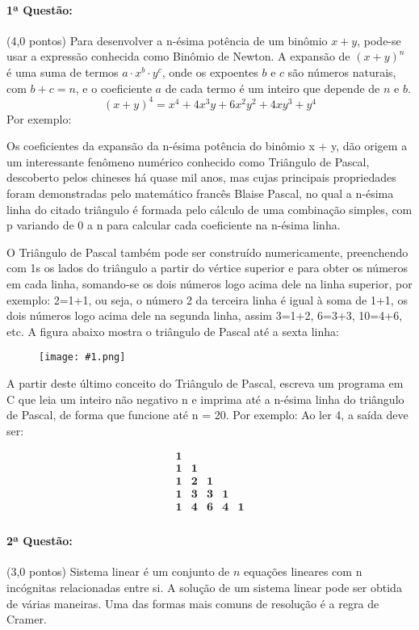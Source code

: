 \documentclass[12pt,a4paper]{article}
\newcommand{\imgh}[2]{\begin{figure}[h]
\centering
\texttt{[image: \#1.png]}
\end{figure}}
\begin{document}
\paragraph{1ª Questão:} (4,0 pontos) Para desenvolver a n-ésima potência de um binômio $x+y$, pode-se usar a expressão conhecida como Binômio de Newton. A expansão de $(x+y)^n$ é uma suma de termos $a\cdot x^b\cdot y^c$, onde os expoentes $b$ e $c$ são números naturais, com $b+c=n$, e o coeficiente $a$ de cada termo é um inteiro que depende de $n$ e $b$. $$(x+y)^4 = x^4 + 4x^3y + 6x^2y^2 + 4xy^3 + y^4$$ Por exemplo:

Os coeficientes da expansão da n-ésima potência do binômio x + y, dão origem a um interessante fenômeno numérico conhecido como Triângulo de Pascal, descoberto pelos chineses há quase mil anos,
mas cujas principais propriedades foram demonstradas pelo matemático francês Blaise Pascal, no qual a n-ésima linha do citado triângulo é formada pelo cálculo de uma combinação simples, com p variando de 0 a n para calcular cada coeficiente na n-ésima linha.

O Triângulo de Pascal também pode ser construído numericamente, preenchendo com 1s os lados do triângulo a partir do vértice superior e para obter os números em cada linha, somando-se os dois
números logo acima dele na linha superior, por exemplo: 2=1+1, ou seja, o número 2 da terceira linha é igual à soma de 1+1, os dois números logo acima dele na segunda linha, assim 3=1+2, 6=3+3, 10=4+6, etc. A figura abaixo mostra o triângulo de Pascal até a sexta linha:

\imgh{icvc2015q1fig1}{4}

A partir deste último conceito do Triângulo de Pascal, escreva um programa em C que leia um inteiro não negativo n e imprima até a n-ésima linha do triângulo de Pascal, de forma que funcione até
n = 20. Por exemplo: Ao ler 4, a saída deve ser:

\large
$$\begin{array}{ccccc}
\mathbf{1} &   &   &   &   \\
\mathbf{1} & \mathbf{1} &   &   &   \\
\mathbf{1} & \mathbf{2} & \mathbf{1} &   &   \\
\mathbf{1} & \mathbf{3} & \mathbf{3} & \mathbf{1} &   \\
\mathbf{1} & \mathbf{4} & \mathbf{6} & \mathbf{4} & \mathbf{1} \\
\end{array}$$
\normalsize

\paragraph{2ª Questão:} (3,0 pontos) Sistema linear é um conjunto de $n$ equações lineares com n incógnitas relacionadas entre si. A solução de um sistema linear pode ser obtida de várias maneiras. Uma das formas mais comuns de resolução é a regra de Cramer.
\end{document}
